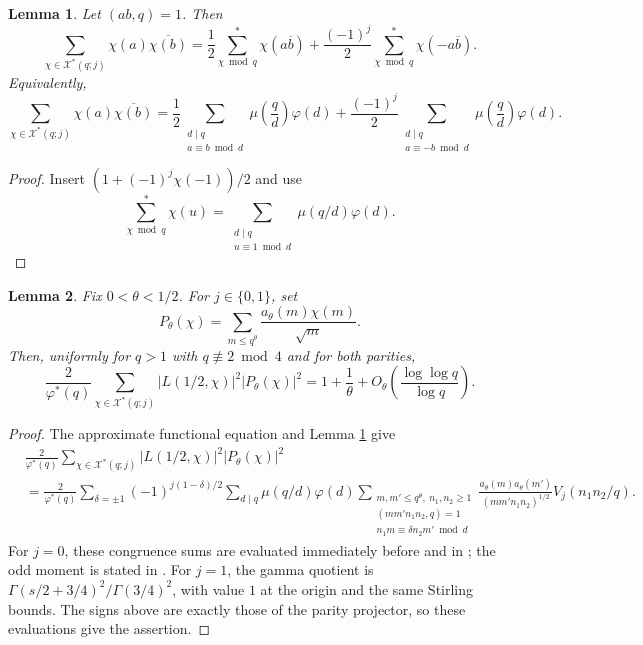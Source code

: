 \documentclass[12pt, a4paper]{amsart}
\numberwithin{equation}{section}
\renewcommand{\bar}[1]{\overline{#1}}
\renewcommand{\le}{\leqslant}
\renewcommand{\ge}{\geqslant}
\theoremstyle{plain}
\newtheorem{lem}{Lemma}[section]
\begin{document}
\begin{lem}\label{lem:parity-orthogonality}
Let $(a b,q)=1$. Then
$$
\sum_{\chi\in\mathcal X^*(q;j)}\chi(a)\overline{\chi(b)}
=
\frac12\sum_{\chi\bmod q}^{*}\chi(a\bar{b})
+
\frac{(-1)^j}{2}\sum_{\chi\bmod q}^{*}\chi(-a\bar{b}).
$$
Equivalently,
$$
\sum_{\chi\in\mathcal X^*(q;j)}\chi(a)\overline{\chi(b)}
=
\frac12\sum_{\substack{d\mid q\\ a\equiv b\bmod d}}\mu\left(\frac{q}{d}\right)\varphi(d)
+
\frac{(-1)^j}{2}
\sum_{\substack{d\mid q\\ a\equiv -b\bmod d}}\mu\left(\frac{q}{d}\right)\varphi(d).
$$
\end{lem}

\begin{proof}
Insert $(1+(-1)^j\chi(-1))/2$ and use
$$
\sum_{\chi\bmod q}^{*}\chi(u)=\sum_{\substack{d\mid q\\ u\equiv1\bmod d}}\mu(q/d)\varphi(d).
$$

\end{proof}

\begin{lem}\label{lem:square-term-parity-transfer}
Fix $0<\theta<1/2$. For $j\in\{0,1\}$, set
$$
P_\theta(\chi)=
\sum_{m\le q^\theta}\frac{a_\theta(m)\chi(m)}{\sqrt m}.
$$
Then, uniformly for $q>1$ with $q\not\equiv2\bmod4$ and for both parities,
$$
\frac{2}{\varphi^*(q)}
\sum_{\chi\in\mathcal X^*(q;j)}
|L(1/2,\chi)|^2|P_\theta(\chi)|^2
=1+\frac1\theta
+O_{\theta}\left(\frac{\log\log q}{\log q}\right).
$$
\end{lem}

\begin{proof}
The approximate functional equation and Lemma \ref{lem:parity-orthogonality} give
\begin{equation}\label{eq:square-parity-divisor-expansion}
\begin{aligned}
&\frac{2}{\varphi^*(q)}
\sum_{\chi\in\mathcal X^*(q;j)}
|L(1/2,\chi)|^2|P_\theta(\chi)|^2\\
&=
\frac{2}{\varphi^*(q)}
\sum_{\delta=\pm1}(-1)^{j(1-\delta)/2}
\sum_{d\mid q}\mu(q/d)\varphi(d)
\sum_{\substack{m,m'\le q^\theta,\ n_1,n_2\ge1\\
(mm'n_1n_2,q)=1\\ n_1m\equiv\delta n_2m'\bmod d}}
\frac{a_\theta(m)a_\theta(m')}
{(mm'n_1n_2)^{1/2}}
V_j(n_1n_2/q).
\end{aligned}
\end{equation}
For $j=0$, these congruence sums are evaluated immediately before and in \cite[(3.1), p.~7]{QW}; the odd moment is stated in \cite[p.~5]{QW}. For $j=1$, the gamma quotient is $\Gamma(s/2+3/4)^2/\Gamma(3/4)^2$, with value $1$ at the origin and the same Stirling bounds. The signs above are exactly those of the parity projector, so these evaluations give the assertion.
\end{proof}
\end{document}
